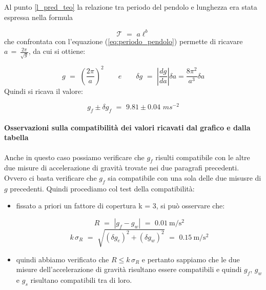 Al punto \ref{l_pred_teo} la relazione tra periodo del pendolo e lunghezza era stata espressa nella formula

\begin{equation*}
\mathcal{T} \,\, = \,\, a\ell^b
\end{equation*}
%
che confrontata con l'equazione (\ref{eq:periodo_pendolo}) permette di ricavare $a \, = \, \frac{2 \pi}{\sqrt{g}}$, da cui si ottiene:

\begin{equation*}
g \,\, = \,\, \left( \frac{2 \pi}{a}\right)^2 \quad\quad e \quad\quad \delta g \,\, = \,\, \left| \frac{dg}{da} \right|  \delta a = \frac{8 \pi^2}{a^3} \delta a
\end{equation*}
%
Quindi si ricava il valore:

\begin{equation}
g_f \pm \delta g_f \,\, = \,\, 9.81 \pm 0.04 \,\, ms^{-2}
\end{equation}

\paragraph{Osservazioni sulla compatibilità dei valori ricavati dal grafico e dalla tabella}

Anche in questo caso possiamo verificare che $g_f$ risulti compatibile con le altre due misure di accelerazione di gravità trovate nei due paragrafi precedenti. Ovvero ci basta verificare che $g_f$ sia compatibile con una sola delle due misusre di $g$ precedenti. Quindi procediamo col test della compatibilità:
\begin{itemize}
	\item{fissato a priori un fattore di copertura k = 3, si può osservare che:
	
		\begin{equation*}
			R \,\, = \,\, |g_f - g_w| \,\, = \,\, \SI{0.01}{\metre\per\square\second}
		\end{equation*}
		\begin{equation*}
			k\,\sigma_R \,\, = \,\, \sqrt{(\delta g_e)^2 + (\delta g_w)^2} \,\, = \,\, \SI{0.15}{\metre\per\square\second}
		\end{equation*}
		}
	\item{quindi abbiamo verificato che $R \leq k\,\sigma_R$ e pertanto sappiamo che le due misure dell'accelerazione di gravità risultano essere compatibili e quindi $g_f$, $g_w$ e $g_s$ risultano compatibili tra di loro.}
\end{itemize}